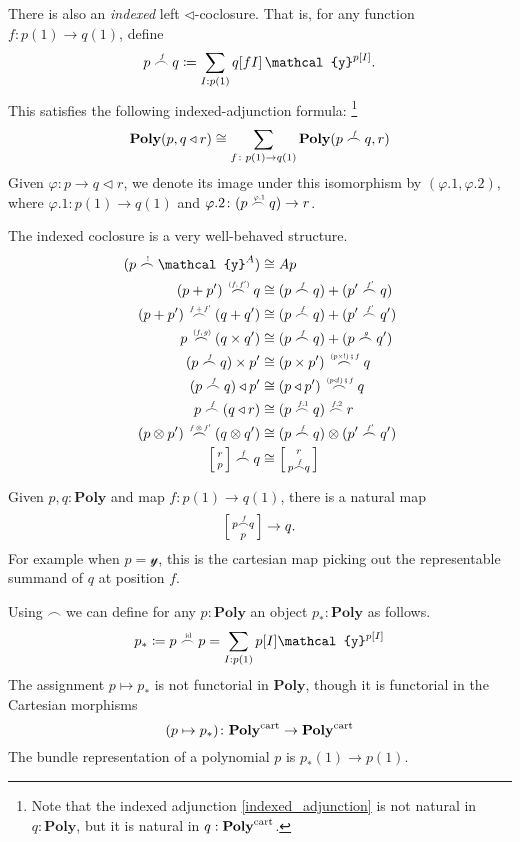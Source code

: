 \documentclass[11pt, one side, article]{memoir}
\makeatletter
\theoremstyle{definition}
\theoremstyle{plain}
\newcommand{\Cat}[1]{\mathbf{#1}}%
\newcommand{\id}{\mathrm{id}}
\newcommand{\then}{\mathbin{\fatsemi}}
\newcommand{\tn}[1]{\textnormal{#1}}
\newcommand{\yon}{{\mathcal{y}}}
\newcommand{\poly}{\Cat{Poly}}
\newcommand{\polycart}{\poly^{\tn{cart}}}
\newcommand{\0}{\textsf{0}}
\newcommand{\1}{\tn{\textsf{1}}}
\newcommand{\tri}{\mathbin{\triangleleft}}
\newcommand{\biglens}[2]{
     \begin{bmatrix}{\vphantom{f_f^f}#2} \\ {\vphantom{f_f^f}#1} \end{bmatrix}
}
\newcommand{\littlelens}[2]{
     \begin{bsmallmatrix}{\vphantom{f}#2} \\ {\vphantom{f}#1} \end{bsmallmatrix}
}
\newcommand{\lens}[2]{
  \relax\if@display
     \biglens{#1}{#2}
  \else
     \littlelens{#1}{#2}
  \fi
}
\newcommand{\indexcoclscale}[1]{\scalebox{.7}{#1}}
\newcommand{\cocl}[1]{
	\scriptsize\overset{\,\indexcoclscale{$#1$}}{\frown}\normalsize
}
\makeatother
\begin{document}
There is also an \emph{indexed} left $\tri$-coclosure. That is, for any function $f\colon p(1)\to q(1)$, define
\begin{equation}
	p\cocl{f}q\coloneqq \sum_{I: p(1)}q[fI]\,\yon^{p[I]}.
\end{equation}
This satisfies the following indexed-adjunction formula:%
\footnote{Note that the indexed adjunction \eqref{indexed_adjunction} is not natural in $q:\poly$, but it is natural in $q:\polycart$.}
\begin{equation}\label{indexed_adjunction}
	\poly(p,q\tri r)\cong\sum_{f\colon p(1)\to q(1)}\poly(p\cocl{f}q,r)
\end{equation}
Given $\varphi\colon p\to q\tri r$, we denote its image under this isomorphism by $(\varphi.1,\varphi.2)$, where $\varphi.1\colon p(1)\to q(1)$ and $\varphi.2\colon (p\cocl{\varphi.1}q)\to r$.

The indexed coclosure is a very well-behaved structure.
\begin{align}
	(p\cocl{!}\yon^A)&\cong Ap\\
	(p+p')\cocl{(f,f')}q&\cong(p\cocl{f}q)+(p'\cocl{f'}q)\\
	(p+p')\cocl{f+f'}(q+q')&\cong(p\cocl{f}q)+(p'\cocl{f'}q')\\
	p\cocl{(f,g)}(q\times q')&\cong(p\cocl{f}q)+(p\cocl{g}q')\\
	(p\cocl{f}q)\times p'&\cong(p\times p')\cocl{(p\times!)\then f}q\\
	(p\cocl{f}q)\tri p'&\cong(p\tri p')\cocl{(p\tri!)\then f}q\\
	p\cocl{f}(q\tri r)&\cong(p\cocl{f.1}q)\cocl{f.2}r\\
	(p\otimes p')\cocl{f\otimes f'}(q\otimes q')&\cong(p\cocl{f}q)\otimes(p'\cocl{f'}q')\\
	\lens{p}{r}\cocl{f}q&\cong\lens{p\cocl{f}q}{r}
\end{align}

Given $p,q:\poly$ and map $f\colon p(1)\to q(1)$, there is a natural map
\begin{equation}
	\lens{p}{p\cocl{f}q}\to q.
\end{equation}
For example when $p=\yon$, this is the cartesian map picking out the representable summand of $q$ at position $f$.

Using $\frown$ we can define for any $p:\poly$ an object $p_*:\poly$ as follows.
\begin{equation}\label{eqn.p_star}
p_*\coloneqq p\cocl{\id}p=\sum_{I: p(1)}p[I]\yon^{p[I]}
\end{equation}
The assignment $p\mapsto p_*$ is not functorial in $\poly$, though it is functorial in the Cartesian morphisms
\begin{equation}
	(p\mapsto p_*)\colon\polycart\to\polycart
\end{equation}
The bundle representation of a polynomial $p$ is $p_*(1)\to p(1)$.
\end{document}
